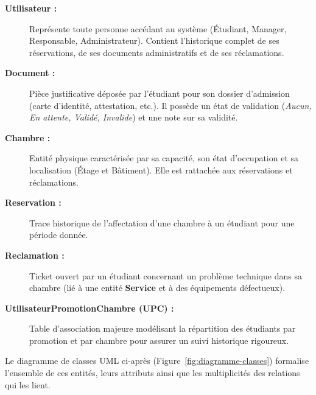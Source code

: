 \documentclass[a4paper,12pt]{article}
\begin{document}
\begin{description}
    \item[\textbf{Utilisateur :}] Représente toute personne accédant au système (Étudiant, Manager, Responsable, Administrateur). Contient l'historique complet de ses réservations, de ses documents administratifs et de ses réclamations.
    \item[\textbf{Document :}] Pièce justificative déposée par l'étudiant pour son dossier d'admission (carte d'identité, attestation, etc.). Il possède un état de validation (\textit{Aucun, En attente, Validé, Invalide}) et une note sur sa validité.
    \item[\textbf{Chambre :}] Entité physique caractérisée par sa capacité, son état d'occupation et sa localisation (Étage et Bâtiment). Elle est rattachée aux réservations et réclamations.
    \item[\textbf{Reservation :}] Trace historique de l'affectation d'une chambre à un étudiant pour une période donnée.
    \item[\textbf{Reclamation :}] Ticket ouvert par un étudiant concernant un problème technique dans sa chambre (lié à une entité \textbf{Service} et à des équipements défectueux).
    \item[\textbf{UtilisateurPromotionChambre (UPC) :}] Table d'association majeure modélisant la répartition des étudiants par promotion et par chambre pour assurer un suivi historique rigoureux.
\end{description}

Le diagramme de classes UML ci-après (Figure~\ref{fig:diagramme-classes}) formalise l'ensemble de ces entités, leurs attributs ainsi que les multiplicités des relations qui les lient.
\end{document}
